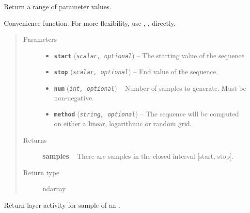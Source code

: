 \documentclass[letterpaper,10pt,english]{sphinxmanual}
\begin{document}
\begin{fulllineitems}
\label{core:core.util.get_range}
Return a range of parameter values.

Convenience function. For more flexibility, use ,
,  directly.
\begin{quote}\begin{description}
\item[{Parameters}] \leavevmode\begin{itemize}
\item {} 
\textbf{\texttt{start}} (\emph{\texttt{scalar, optional}}) -- The starting value of the sequence

\item {} 
\textbf{\texttt{stop}} (\emph{\texttt{scalar, optional}}) -- End value of the sequence.

\item {} 
\textbf{\texttt{num}} (\emph{\texttt{int, optional}}) -- Number of samples to generate. Must be non-negative.

\item {} 
\textbf{\texttt{method}} (\emph{\texttt{string, optional}}) -- The sequence will be computed on either a linear, logarithmic or random
grid.

\end{itemize}

\item[{Returns}] \leavevmode
\textbf{samples} -- There are  samples in the closed interval {[}start, stop{]}.

\item[{Return type}] \leavevmode
ndarray

\end{description}\end{quote}

\end{fulllineitems}


\begin{fulllineitems}
\label{core:core.util.get_sample_activity_from_batch}
Return layer activity for sample  of an .

\end{fulllineitems}
\end{document}
